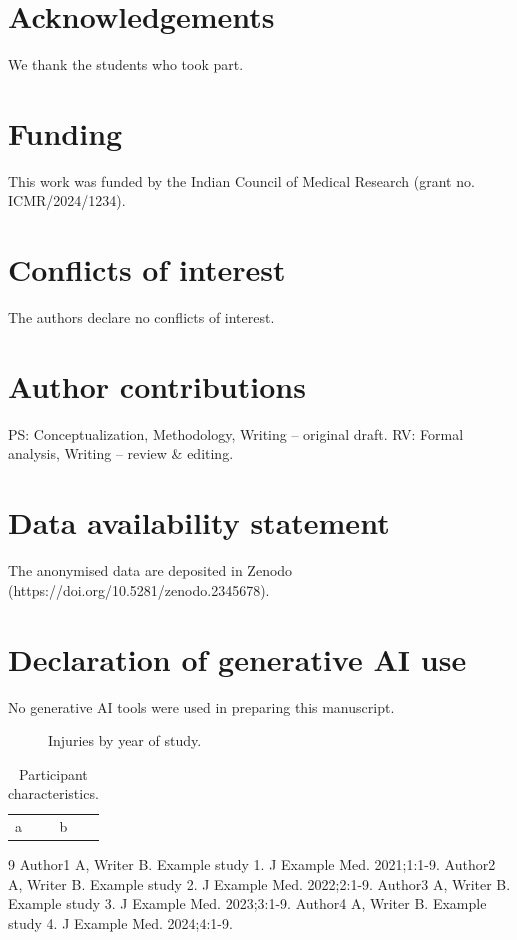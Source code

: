 \documentclass{article}
\begin{document}
\section{Acknowledgements}
We thank the students who took part.
\section{Funding}
This work was funded by the Indian Council of Medical Research (grant no. ICMR/2024/1234).
\section{Conflicts of interest}
The authors declare no conflicts of interest.
\section{Author contributions}
PS: Conceptualization, Methodology, Writing -- original draft. RV: Formal analysis, Writing -- review \& editing.
\section{Data availability statement}
The anonymised data are deposited in Zenodo (https://doi.org/10.5281/zenodo.2345678).
\section{Declaration of generative AI use}
No generative AI tools were used in preparing this manuscript.

\begin{figure}\caption{Injuries by year of study.}\label{fig:inj}\end{figure}
\begin{table}\caption{Participant characteristics.}\label{tab:inj}\begin{tabular}{ll}a & b\end{tabular}\end{table}
\begin{thebibliography}{9}
 Author1 A, Writer B. Example study 1. J Example Med. 2021;1:1-9.
 Author2 A, Writer B. Example study 2. J Example Med. 2022;2:1-9.
 Author3 A, Writer B. Example study 3. J Example Med. 2023;3:1-9.
 Author4 A, Writer B. Example study 4. J Example Med. 2024;4:1-9.
\end{thebibliography}
\end{document}
